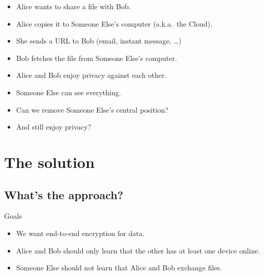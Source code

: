 \begin{frame}
  \begin{example}
    \begin{itemize}
      \item Alice wants to share a file with Bob.
      \item Alice copies it to Someone Else's computer (a.k.a.\ the Cloud).
      \item She sends a URL to Bob (email, instant message, \dots)
      \item Bob fetches the file from Someone Else's computer.
    \end{itemize}
  \end{example}
\end{frame}

\begin{frame}
  \begin{remark}
    \begin{itemize}
      \item Alice and Bob enjoy privacy against each other.
      \item Someone Else can see everything.
    \end{itemize}
  \end{remark}

  \pause

  \begin{question}
    \begin{itemize}
      \item Can we remove Someone Else's central position?
      \item And still enjoy privacy?
    \end{itemize}
  \end{question}
\end{frame}


\section{The solution}

\subsection{What's the approach?}

\begin{frame}
  \begin{block}{Goals}
  \begin{itemize}
    \item We want end-to-end encryption for data.
    \item Alice and Bob should only learn that the other has at least one 
      device online.
    \item Someone Else should not learn that Alice and Bob exchange files.
    \end{itemize}
  \end{block}
\end{frame}

